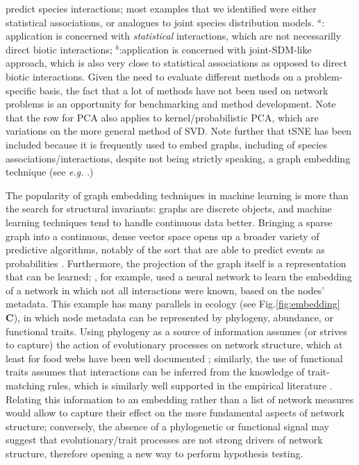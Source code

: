 \begin{table}[h!]
{predict species interactions; most examples that we identified were
either statistical associations, or analogues to joint species
distribution models. \(^a\): application is concerned with
\emph{statistical} interactions, which are not necessarilly direct
biotic interactions; \(^b\):application is concerned with joint-SDM-like
approach, which is also very close to statistical associations as
opposed to direct biotic interactions. Given the need to evaluate
different methods on a problem-specific basis, the fact that a lot of
methods have not been used on network problems is an opportunity for
benchmarking and method development. Note that the row for PCA also
applies to kernel/probabilistic PCA, which are variations on the more
general method of SVD. Note further that tSNE has been included because
it is frequently used to embed graphs, including of species
associations/interactions, despite not being strictly speaking, a graph
embedding technique (see \emph{e.g.} \cite{Chami2022Machine}.)}
\label{tbl:methods}
\end{table}

The popularity of graph embedding techniques in machine learning is more
than the search for structural invariants: graphs are discrete objects,
and machine learning techniques tend to handle continuous data better.
Bringing a sparse graph into a continuous, dense vector space
\cite{Xu2021Understanding} opens up a broader variety of predictive
algorithms, notably of the sort that are able to predict events as
probabilities \cite{Murphy2022Probabilistic}. Furthermore, the
projection of the graph itself is a representation that can be learned;
\cite{Runghen2021Exploiting}, for example, used a neural network to learn the
embedding of a network in which not all interactions were known, based
on the nodes' metadata. This example has many parallels in ecology (see
Fig.\ref{fig:embedding} \textbf{C}), in which node metadata can be represented by
phylogeny, abundance, or functional traits. Using phylogeny as a source
of information assumes (or strives to capture) the action of
evolutionary processes on network structure, which at least for food
webs have been well documented \cite{Braga2021Phylogenetic,
DallaRiva2016Exploring, Eklof2016Phylogenetic, Stouffer2007Evidence,
Stouffer2012Evolutionary}; similarly, the use of functional traits
assumes that interactions can be inferred from the knowledge of
trait-matching rules, which is similarly well supported in the empirical
literature \cite{Bartomeus2013Understanding, Bartomeus2016Common,
Goebel2023Body, Gravel2013Inferring}. Relating this information to
an embedding rather than a list of network measures would allow to
capture their effect on the more fundamental aspects of network
structure; conversely, the absence of a phylogenetic or functional
signal may suggest that evolutionary/trait processes are not strong
drivers of network structure, therefore opening a new way to perform
hypothesis testing.

